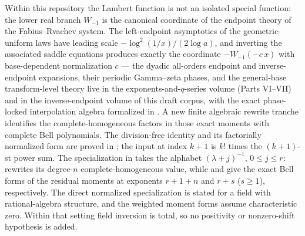 \documentclass[11pt]{article}
\theoremstyle{remark}
\begin{document}
Within this repository the Lambert function is not an isolated special
function: the lower real branch \(W_{-1}\) is the canonical coordinate of
the endpoint theory of the Fabius--Rvachev system.  The left-endpoint
asymptotics of the geometric-uniform laws have leading scale
\(-\log^2(1/x)/(2\log a)\), and inverting the associated saddle equations
produces exactly the coordinate \(-W_{-1}(-c\,x)\) with base-dependent
normalization \(c\) --- the dyadic all-orders endpoint and inverse-endpoint
expansions, their periodic Gamma--zeta phases, and the general-base
transform-level theory live in the exponents-and-\(q\)-series volume
(Parts VI--VII) and in the inverse-endpoint volume of this draft corpus,
with the exact phase-locked interpolation algebra formalized in
.  A new finite algebraic rewrite
tranche identifies the complete-homogeneous factors in those exact moments
with complete Bell polynomials.  The division-free identity
 and its factorially
normalized form
are proved in ; the input at index
\(k+1\) is \(k!\) times the \((k+1)\)-st power sum.  The specialization in
 takes the alphabet
\((\lambda+j)^{-1}\), \(0\leq j\leq r\):
 rewrites its
degree-\(n\) complete-homogeneous value, while
 and
 give the exact
Bell forms of the residual moments at exponents \(r+1+n\) and \(r+s\)
(\(s\geq1\)), respectively.  The direct normalized specialization is stated
for a field with rational-algebra structure, and the weighted moment forms
assume characteristic zero.  Within that setting field inversion is total,
so no positivity or nonzero-shift hypothesis is added.
\end{document}
